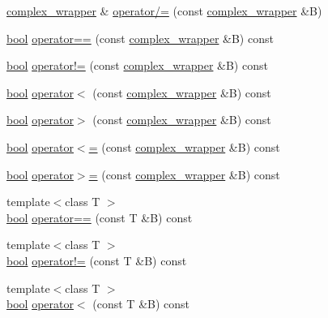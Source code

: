 \begin{DoxyCompactItemize}
\item 
\hyperlink{classcomplex__wrapper}{complex\+\_\+wrapper} \& \hyperlink{classcomplex__wrapper_a5322c78ccff8346b31c6a37d28b63e27}{operator/=} (const \hyperlink{classcomplex__wrapper}{complex\+\_\+wrapper} \&B)
\item 
\hyperlink{compiler_8h_abb452686968e48b67397da5f97445f5b}{bool} \hyperlink{classcomplex__wrapper_a4a9e0fa7a7b2d260e1f2b6ce05755655}{operator==} (const \hyperlink{classcomplex__wrapper}{complex\+\_\+wrapper} \&B) const 
\item 
\hyperlink{compiler_8h_abb452686968e48b67397da5f97445f5b}{bool} \hyperlink{classcomplex__wrapper_a518df8dd0b677700a6d5a9b2664bde89}{operator!=} (const \hyperlink{classcomplex__wrapper}{complex\+\_\+wrapper} \&B) const 
\item 
\hyperlink{compiler_8h_abb452686968e48b67397da5f97445f5b}{bool} \hyperlink{classcomplex__wrapper_a271297c16c3fb11af3649e360d0c556e}{operator$<$} (const \hyperlink{classcomplex__wrapper}{complex\+\_\+wrapper} \&B) const 
\item 
\hyperlink{compiler_8h_abb452686968e48b67397da5f97445f5b}{bool} \hyperlink{classcomplex__wrapper_a7b3189dc6cab97c0dc08637ea9773a46}{operator$>$} (const \hyperlink{classcomplex__wrapper}{complex\+\_\+wrapper} \&B) const 
\item 
\hyperlink{compiler_8h_abb452686968e48b67397da5f97445f5b}{bool} \hyperlink{classcomplex__wrapper_a3b8367c68c3743a161e9663c37bd3b2f}{operator$<$=} (const \hyperlink{classcomplex__wrapper}{complex\+\_\+wrapper} \&B) const 
\item 
\hyperlink{compiler_8h_abb452686968e48b67397da5f97445f5b}{bool} \hyperlink{classcomplex__wrapper_abb7a5b0f89f7b49bc818684946ed5c4c}{operator$>$=} (const \hyperlink{classcomplex__wrapper}{complex\+\_\+wrapper} \&B) const 
\item 
{\footnotesize template$<$class T $>$ }\\\hyperlink{compiler_8h_abb452686968e48b67397da5f97445f5b}{bool} \hyperlink{classcomplex__wrapper_ab458839c79b4a1d328e33dcd3a7215ef}{operator==} (const T \&B) const 
\item 
{\footnotesize template$<$class T $>$ }\\\hyperlink{compiler_8h_abb452686968e48b67397da5f97445f5b}{bool} \hyperlink{classcomplex__wrapper_a292a6fa7170bb7d7ee26c0c2e96c888b}{operator!=} (const T \&B) const 
\item 
{\footnotesize template$<$class T $>$ }\\\hyperlink{compiler_8h_abb452686968e48b67397da5f97445f5b}{bool} \hyperlink{classcomplex__wrapper_a29b10aa578c5bc7afb654e0322a21a85}{operator$<$} (const T \&B) const 

\end{DoxyCompactItemize}
